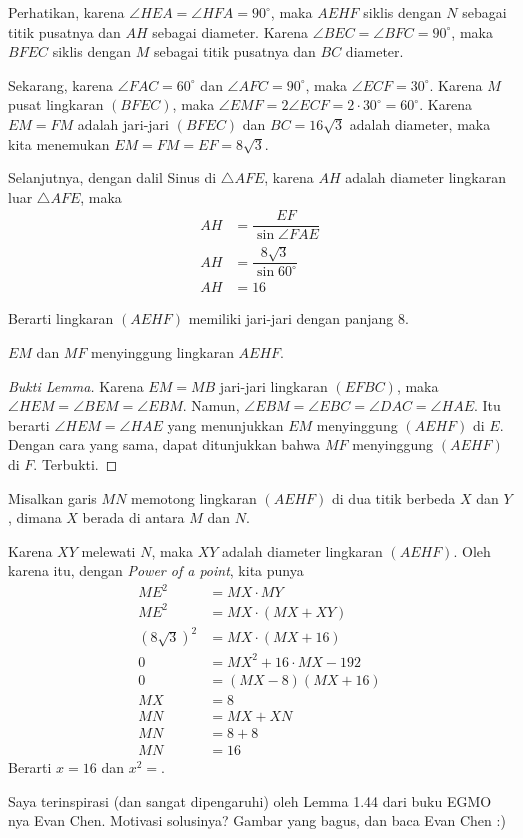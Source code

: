 \documentclass[12pt]{scrartcl}
\begin{document}
\begin{jawaban}
Perhatikan, karena $\angle HEA = \angle HFA = 90^\circ$, maka $AEHF$ siklis dengan $N$ sebagai titik pusatnya dan $AH$ sebagai diameter. Karena $\angle BEC = \angle BFC = 90^\circ$, maka $BFEC$ siklis dengan $M$ sebagai titik pusatnya dan $BC$ diameter. 

Sekarang, karena $\angle FAC = 60^\circ$ dan $\angle AFC = 90^\circ$, maka $\angle ECF = 30^\circ$. Karena $M$ pusat lingkaran $(BFEC)$, maka $\angle EMF = 2 \angle ECF = 2 \cdot 30^\circ = 60^\circ$. Karena $EM=FM$ adalah jari-jari $(BFEC)$ dan $BC=16\sqrt{3}$ adalah diameter, maka kita menemukan $EM=FM=EF=8\sqrt{3}$.

Selanjutnya, dengan dalil Sinus di $\triangle AFE$, karena $AH$ adalah diameter lingkaran luar $\triangle AFE$, maka 
\begin{align*}
AH &= \dfrac{EF}{\sin \angle FAE}\\
AH &= \dfrac{8\sqrt{3}}{\sin 60^\circ}\\
AH &= 16
\end{align*}

Berarti lingkaran $(AEHF)$ memiliki jari-jari dengan panjang 8.

\begin{lemma}
$EM$ dan $MF$ menyinggung lingkaran $AEHF$.
\begin{proof}[Bukti Lemma]
Karena $EM=MB$ jari-jari lingkaran $(EFBC)$, maka $\angle HEM = \angle BEM = \angle EBM$. Namun, $\angle EBM = \angle EBC = \angle DAC = \angle HAE$. Itu berarti $\angle HEM= \angle HAE$ yang menunjukkan $EM$ menyinggung $(AEHF)$ di $E$. Dengan cara yang sama, dapat ditunjukkan bahwa $MF$ menyinggung $(AEHF)$ di $F$. Terbukti.
\end{proof}
\end{lemma}

Misalkan garis $MN$ memotong lingkaran $(AEHF)$ di dua titik berbeda $X$ dan $Y$, dimana $X$ berada di antara $M$ dan $N$. 

Karena $XY$ melewati $N$, maka $XY$ adalah diameter lingkaran $(AEHF)$. Oleh karena itu, dengan \textit{Power of a point}, kita punya
\begin{align*}
ME^2 &= MX \cdot MY\\
ME^2 &= MX \cdot (MX + XY)\\
(8\sqrt{3})^2 &= MX \cdot (MX + 16)\\
0 &= MX^2 + 16\cdot MX - 192\\
0 &= (MX-8)(MX+16)\\
MX &= 8\\
MN &= MX + XN\\
MN &= 8 + 8\\
MN &= 16
\end{align*}
Berarti $x=16$ dan $x^2=$.

\end{jawaban}
\begin{remark}
Saya terinspirasi (dan sangat dipengaruhi) oleh Lemma 1.44 dari buku EGMO nya Evan Chen. Motivasi solusinya? Gambar yang bagus, dan baca Evan Chen :)
\end{remark}
\end{document}
